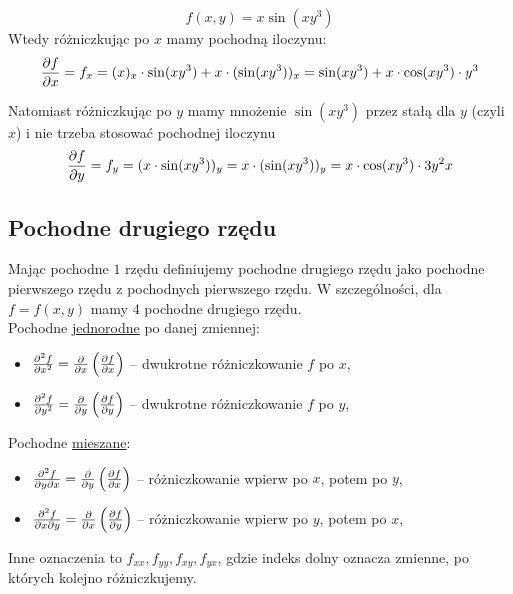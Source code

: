 \begin{przyklad}

$$ f(x,y) = x \sin (xy^3) $$
Wtedy różniczkując po $x$ mamy pochodną iloczynu:
\[ \frac{\partial f}{\partial x} = f_x = (x)_x \cdot \sin(xy^3) + x \cdot (\sin (xy^3))_x = \sin(xy^3) + x \cdot \cos(xy^3) \cdot y^3 \]

Natomiast różniczkując po $y$ mamy mnożenie $\sin (xy^3)$ przez stałą dla $y$ (czyli $x$) i nie trzeba stosować pochodnej iloczynu
\[ \frac{\partial f}{\partial y} = f_y = (x \cdot \sin (xy^3))_y = x \cdot (\sin (xy^3))_y = x \cdot \cos(xy^3) \cdot 3y^2x \]
\end{przyklad}


\subsection*{Pochodne drugiego rzędu}

Mając pochodne $1$ rzędu definiujemy pochodne drugiego rzędu jako pochodne pierwszego rzędu z pochodnych pierwszego rzędu.
W szczególności, dla $ f = f(x,y) $ mamy $4$ pochodne drugiego rzędu. \\

Pochodne \underline{jednorodne} po danej zmiennej:
\begin{itemize}
    \item $ \frac{\partial^2 f}{\partial x^2} = \frac{\partial }{\partial x} \left( \frac{\partial f}{\partial x} \right) $ -- dwukrotne różniczkowanie $f$ po $x$,
    \item $ \frac{\partial^2 f}{\partial y^2} = \frac{\partial }{\partial y} \left( \frac{\partial f}{\partial y} \right) $ -- dwukrotne różniczkowanie $f$ po $y$,
\end{itemize}

Pochodne \underline{mieszane}:

\begin{itemize}
    \item $ \frac{\partial^2 f}{\partial y \partial x} = \frac{\partial }{\partial y} \left( \frac{\partial f}{\partial x} \right) $ -- różniczkowanie wpierw po $x$, potem po $y$,
    \item $ \frac{\partial^2 f}{\partial x \partial y} = \frac{\partial }{\partial x} \left( \frac{\partial f}{\partial y} \right) $ -- różniczkowanie wpierw po $y$, potem po $x$, \\
\end{itemize}

Inne oznaczenia to $ f_{xx}, f_{yy}, f_{xy}, f_{yx} $, gdzie indeks dolny oznacza zmienne, po których kolejno różniczkujemy.

